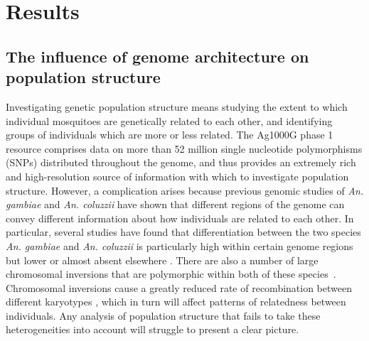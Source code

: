\documentclass[a4paper,11pt,abstracton,hidelinks]{scrartcl}
\begin{document}
\section{Results}\label{sec:results}


\subsection{The influence of genome architecture on population structure}\label{subsec:treescan}


Investigating genetic population structure means studying the extent to which individual mosquitoes are genetically related to each other, and identifying groups of individuals which are more or less related.
%
The Ag1000G phase 1 resource comprises data on more than 52 million single nucleotide polymorphisms (SNPs) distributed throughout the genome, and thus provides an extremely rich and high-resolution source of information with which to investigate population structure.
%
However, a complication arises because previous genomic studies of \textit{An. gambiae} and \textit{An. coluzzii} have shown that different regions of the genome can convey different information about how individuals are related to each other.
%
In particular, several studies have found that differentiation between the two species \textit{An. gambiae} and \textit{An. coluzzii} is particularly high within certain genome regions but lower or almost absent elsewhere \parencite{Turner2005,White2010,Weetman2012,Cruickshank2014}.
%
There are also a number of large chromosomal inversions that are polymorphic within both of these species~\parencite{dellaTorre2001,Coluzzi2002}.
%
Chromosomal inversions cause a greatly reduced rate of recombination between different karyotypes \parencite{Stump2007}, which in turn will affect patterns of relatedness between individuals.
%
Any analysis of population structure that fails to take these heterogeneities into account will struggle to present a clear picture.
%
\end{document}
